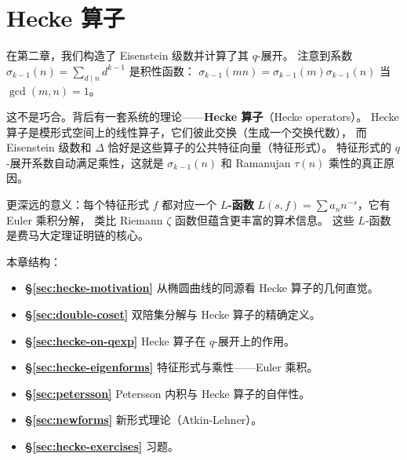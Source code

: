 \chapter{Hecke 算子}
\label{ch:hecke}

在第二章，我们构造了 Eisenstein 级数并计算了其 $q$-展开。
注意到系数 $\sigma_{k-1}(n) = \sum_{d \mid n} d^{k-1}$ 是积性函数：
$\sigma_{k-1}(mn) = \sigma_{k-1}(m)\sigma_{k-1}(n)$ 当 $\gcd(m,n)=1$。

这不是巧合。背后有一套系统的理论——\textbf{Hecke 算子}（Hecke operators）。
Hecke 算子是模形式空间上的线性算子，它们彼此交换（生成一个交换代数），
而 Eisenstein 级数和 $\Delta$ 恰好是这些算子的公共特征向量（特征形式）。
特征形式的 $q$-展开系数自动满足乘性，这就是 $\sigma_{k-1}(n)$ 和 Ramanujan $\tau(n)$ 乘性的真正原因。

更深远的意义：每个特征形式 $f$ 都对应一个 \textbf{$L$-函数}
$L(s,f) = \sum a_n n^{-s}$，它有 Euler 乘积分解，
类比 Riemann $\zeta$ 函数但蕴含更丰富的算术信息。
这些 $L$-函数是费马大定理证明链的核心。

本章结构：
\begin{itemize}
  \item \textbf{§\ref{sec:hecke-motivation}} 从椭圆曲线的同源看 Hecke 算子的几何直觉。
  \item \textbf{§\ref{sec:double-coset}} 双陪集分解与 Hecke 算子的精确定义。
  \item \textbf{§\ref{sec:hecke-on-qexp}} Hecke 算子在 $q$-展开上的作用。
  \item \textbf{§\ref{sec:hecke-eigenforms}} 特征形式与乘性——Euler 乘积。
  \item \textbf{§\ref{sec:petersson}} Petersson 内积与 Hecke 算子的自伴性。
  \item \textbf{§\ref{sec:newforms}} 新形式理论（Atkin-Lehner）。
  \item \textbf{§\ref{sec:hecke-exercises}} 习题。
\end{itemize}










